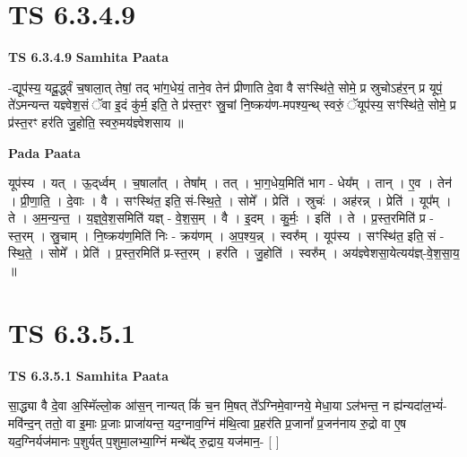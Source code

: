 \documentclass[17pt]{extarticle}
\begin{document}
\section*{ TS 6.3.4.9 }

\textbf{TS 6.3.4.9 } \newline
\textbf{Samhita Paata} \newline

-द्यूप॑स्य॒ यदू॒र्द्ध्वं च॒षाला॒त् तेषां॒ तद् भा॑ग॒धेयं॒ ताने॒व तेन॑ प्रीणाति दे॒वा वै सꣳस्थि॑ते॒ सोमे॒ प्र स्रुचोऽह॑र॒न् प्र यूपं॒ ते॑ऽमन्यन्त यज्ञ्वेश॒सं ॅवा इ॒दं कु॑र्म॒ इति॒ ते प्र॑स्त॒रꣳ स्रु॒चां नि॒ष्क्रय॑ण-मपश्य॒न्थ् स्वरुं॒ ॅयूप॑स्य॒ सꣳस्थि॑ते॒ सोमे॒ प्र प्र॑स्त॒रꣳ हर॑ति जु॒होति॒ स्वरु॒मय॑ज्ञ्वेशसाय ॥ \newline

\textbf{Pada Paata} \newline

यूप॑स्य । यत् । ऊ॒द्‌र्ध्वम् । च॒षाला᳚त् । तेषा᳚म् । तत् । भा॒ग॒धेय॒मिति॑ भाग - धेय᳚म् । तान् । ए॒व । तेन॑ । प्री॒णा॒ति॒ । दे॒वाः । वै । सꣳस्थि॑त॒ इति॒ सं-स्थि॒ते॒ । सोमे᳚ । प्रेति॑ । स्रुचः॑ । अह॑रन्न् । प्रेति॑ । यूप᳚म् । ते । अ॒म॒न्य॒न्त॒ । य॒ज्ञ्॒वे॒श॒समिति॑ यज्ञ् - वे॒श॒स॒म् । वै । इ॒दम् । कु॒र्मः॒ । इति॑ । ते । प्र॒स्त॒रमिति॑ प्र - स्त॒रम् । स्रु॒चाम् । नि॒ष्क्रय॑ण॒मिति॑ निः - क्रय॑णम् । अ॒प॒श्य॒न्न् । स्वरु᳚म् । यूप॑स्य । सꣳस्थि॑त॒ इति॒ सं - स्थि॒ते॒ । सोमे᳚ । प्रेति॑ । प्र॒स्त॒रमिति॑ प्र-स्त॒रम् । हर॑ति । जु॒होति॑ । स्वरु᳚म् । अय॑ज्ञ्वेशसा॒येत्यय॑ज्ञ्-वे॒श॒सा॒य॒ ॥  \newline




\section*{ TS 6.3.5.1 }

\textbf{TS 6.3.5.1 } \newline
\textbf{Samhita Paata} \newline

सा॒द्ध्या वै दे॒वा अ॒स्मिॅल्लो॒क आ॑स॒न् नान्यत् किं॑ च॒न मि॒षत् ते᳚ऽग्निमे॒वाग्नये॒ मेधा॒या ऽल॑भन्त॒ न ह्य॑न्यदा॑ल॒भ्यं॑-मवि॑न्द॒न् ततो॒ वा इ॒माः प्र॒जाः प्राजा॑यन्त॒ यद॒ग्नाव॒ग्निं म॑थि॒त्वा प्र॒हर॑ति प्र॒जानां᳚ प्र॒जन॑नाय रु॒द्रो वा ए॒ष यद॒ग्निर्यज॑मानः प॒शुर्यत् प॒शुमा॒लभ्या॒ग्निं मन्थे᳚द् रु॒द्राय॒ यज॑मान॒- [  ] \newline
\end{document}
